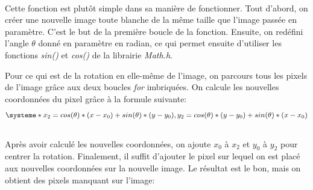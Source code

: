 \documentclass{article}
\begin{document}
\paragraph{}
Cette fonction est plutôt simple dans sa manière de fonctionner. Tout d'abord, on créer une nouvelle image toute blanche de la même taille que l'image passée en paramètre. C'est le but de la première boucle de la fonction. Ensuite, on redéfini l'angle $\theta$ donné en paramètre en radian, ce qui permet ensuite d'utiliser les fonctions \textit{sin()} et \textit{cos()} de la librairie \textit{Math.h}. 
\par Pour ce qui est de la rotation en elle-même de l'image, on parcours tous les pixels de l'image grâce aux deux boucles \textit{for} imbriquées. On calcule les nouvelles coordonnées du pixel grâce à la formule suivante: \\
\[
\systeme*{x_2 = cos(\theta)*(x - x_0) + sin(\theta)*(y - y_0), y_2 = cos(\theta)*(y - y_0) + sin(\theta)*(x - x_0)}
\] \\
Après avoir calculé les nouvelles coordonnées, on ajoute $x_0$ à $x_2$ et $y_0$ à $y_2$ pour centrer la rotation. Finalement, il suffit d'ajouter le pixel sur lequel on est placé aux nouvelles coordonnées sur la nouvelle image. Le résultat est le bon, mais on obtient des pixels manquant sur l'image: \\
\end{document}
